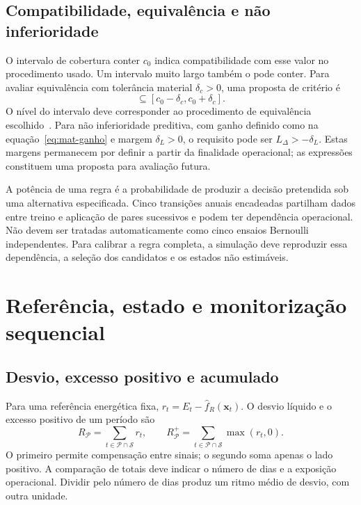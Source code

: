 \subsection{Compatibilidade, equivalência e não inferioridade}
\label{sec:mat-equivalencia}
O intervalo de cobertura conter $c_0$ indica compatibilidade com esse valor no procedimento usado. Um intervalo muito largo também o pode conter. Para avaliar equivalência com tolerância material $\delta_c>0$, uma proposta de critério é
\begin{equation}
[L_c,U_c]\subseteq[c_0-\delta_c,c_0+\delta_c].
\label{eq:mat-equivalencia}
\end{equation}
O nível do intervalo deve corresponder ao procedimento de equivalência escolhido~\parencite{Lakens2017}. Para não inferioridade preditiva, com ganho definido como na equação~\ref{eq:mat-ganho} e margem $\delta_L>0$, o requisito pode ser $L_\Delta>-\delta_L$. Estas margens permanecem por definir a partir da finalidade operacional; as expressões constituem uma proposta para avaliação futura.

A potência de uma regra é a probabilidade de produzir a decisão pretendida sob uma alternativa especificada. Cinco transições anuais encadeadas partilham dados entre treino e aplicação de pares sucessivos e podem ter dependência operacional. Não devem ser tratadas automaticamente como cinco ensaios Bernoulli independentes. Para calibrar a regra completa, a simulação deve reproduzir essa dependência, a seleção dos candidatos e os estados não estimáveis.


\section{Referência, estado e monitorização sequencial}
\label{sec:mat-monitorizacao}

\subsection{Desvio, excesso positivo e acumulado}
\label{sec:mat-excesso}
Para uma referência energética fixa, $r_t=E_t-\widehat f_R(\boldsymbol x_t)$. O desvio líquido e o excesso positivo de um período são
\begin{equation}
R_{\mathcal P}=\sum_{t\in\mathcal P\cap\mathcal S}r_t,
\qquad R_{\mathcal P}^{+}=\sum_{t\in\mathcal P\cap\mathcal S}\max(r_t,0).
\label{eq:mat-acumulados}
\end{equation}
O primeiro permite compensação entre sinais; o segundo soma apenas o lado positivo. A comparação de totais deve indicar o número de dias e a exposição operacional. Dividir pelo número de dias produz um ritmo médio de desvio, com outra unidade.

